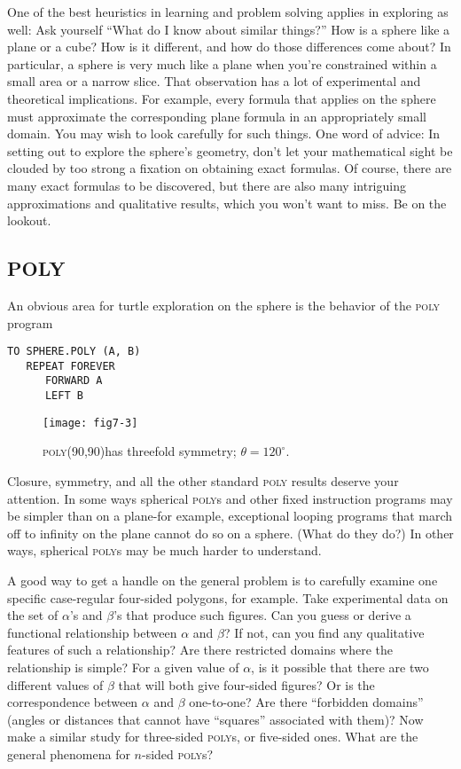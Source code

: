\documentclass{book}
\begin{document}
One of the best heuristics in learning and problem solving applies in
exploring as well: Ask yourself ``What do I know about similar things?''
How is a sphere like a plane or a cube? How is it different, and how do
those differences come about? In particular, a sphere is very much like
a plane when you're constrained within a small area or a narrow slice.
That observation has a lot of experimental and theoretical implications.
For example, every formula that applies on the sphere must approximate
the corresponding plane formula in an appropriately small domain. You
may wish to look carefully for such things.
One word of advice: In setting out to explore the sphere's geometry,
don't let your mathematical sight be clouded by too strong a fixation
on obtaining exact formulas. Of course, there are many exact formulas
to be discovered, but there are also many intriguing approximations and
qualitative results, which you won't want to miss. Be on the lookout.

\subsection{POLY}

An obvious area for turtle exploration on the sphere is the behavior of
the \textsc{poly} program

\begin{verbatim}
TO SPHERE.POLY (A, B)
   REPEAT FOREVER
      FORWARD A
      LEFT B
\end{verbatim}
\begin{figure}
\begin{center}
\texttt{[image: fig7-3]}
\caption{\textsc{poly}(90,90)has threefold symmetry; $\theta = 120^{\circ}$.}
\end{center}
\end{figure}

Closure, symmetry, and all the other standard \textsc{poly} results deserve your
attention. In some ways spherical \textsc{poly}s and other fixed instruction
programs may be simpler than on a plane-for example, exceptional
looping programs that march off to infinity on the plane cannot do so
on a sphere. (What do they do?) In other ways, spherical \textsc{poly}s may be
much harder to understand.

A good way to get a handle on the general problem is to carefully
examine one specific case-regular four-sided polygons, for example.
Take experimental data on the set of $\alpha$'s and $\beta$'s that produce such
figures. Can you guess or derive a functional relationship between $\alpha$ and
$\beta$? If not, can you find any qualitative features of such a relationship?
Are there restricted domains where the relationship is simple? For a
given value of $\alpha$, is it possible that there are two different values of $\beta$
that will both give four-sided figures? Or is the correspondence between
$\alpha$ and $\beta$ one-to-one? Are there ``forbidden domains'' (angles or distances
that cannot have ``squares'' associated with them)? Now make a similar
study for three-sided \textsc{poly}s, or five-sided ones. What are the general
phenomena for $n$-sided \textsc{poly}s?
\end{document}
